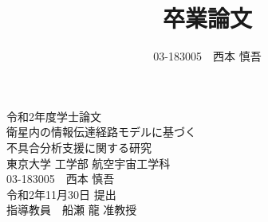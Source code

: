 \documentclass[11pt]{jsreport}%
\title{卒業論文} %
\date{\TheDay}
\author{
03-183005　西本 慎吾%
}
\newcommand{\DATE}[3]{#1年#2月#3日} %
\newcommand{\TheDay}{\DATE{令和2}{11}{30}}
\begin{document}
\begin{titlepage}
  \begin{center}
  \vspace*{10zh}
  {\LARGE 令和2年度学士論文}
  \vspace{2zh} \\
  {\huge 衛星内の情報伝達経路モデルに基づく\\不具合分析支援に関する研究}
   \vspace{25zh} \\
   {\Large 東京大学 工学部 航空宇宙工学科}\\
   \vspace{1zh}
   {\Large 03-183005　西本 慎吾}\\
  \vspace{3zh} 
  {\large \TheDay}
  {\large 提出}\\
   \vspace{1zh}
   {\large 指導教員　船瀬 龍 准教授}
  \end{center}
\end{titlepage}


  

\pagestyle{headings}
\setcounter{tocdepth}{3}
\tableofcontents
\listoffigures
\listoftables





 

\end{document}
